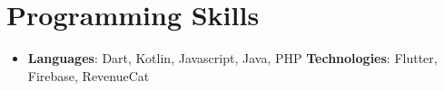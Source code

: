 \documentclass[letterpaper,11pt]{article}
\newcommand{\resumeSubHeadingListStart}{\begin{itemize}[leftmargin=*]}
\newcommand{\resumeSubHeadingListEnd}{\end{itemize}}
\begin{document}
%
\section{Programming Skills}
 \resumeSubHeadingListStart
   \item{
     \textbf{Languages}{: Dart, Kotlin, Javascript, Java, PHP}
     \hfill
     \textbf{Technologies}{: Flutter, Firebase, RevenueCat}
   }
 \resumeSubHeadingListEnd


\end{document}
